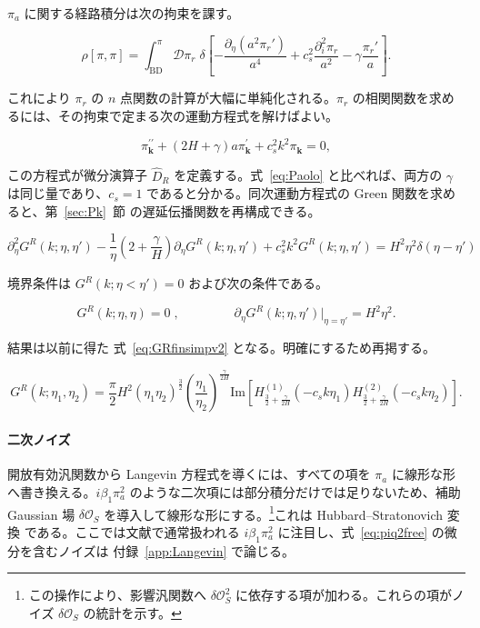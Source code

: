 \documentclass[a4paper,11pt]{ltjsarticle}
\numberwithin{equation}{section}
\def\pia{\pi_{a}}
\def\pir{\pi_{r}}
\def\bfk{\textbf{k}}
\newcommand{\Os}{\delta \mathcal{O}_{S}}
\newcommand{\Eq}[1]{Eq.~(\ref{#1})}
\newcommand{\Sec}[1]{Sec.~\ref{#1}}
\newcommand{\App}[1]{Appendix~\ref{#1}}
\renewcommand{\Eq}[1]{式~\eqref{#1}}
\renewcommand{\Sec}[1]{第~\ref{#1}~節}
\renewcommand{\App}[1]{付録~\ref{#1}}
\begin{document}
$\pia$ に関する経路積分は次の拘束を課す。

\begin{equation}
    \rho[\pi,\pi]=\int_{\text{BD}}^{\pi}\mathcal{D}\pir\;\delta\left[ - \frac{\partial_{\eta}\left(a^{2}\pir'\right)}{a^{4}} + c_{s}^{2}  \frac{\partial_i^{2} \pir}{a^{2}} -   \gamma  \frac{\pir'}{a}\right].
\end{equation}

これにより $\pir$ の $n$ 点関数の計算が大幅に単純化される。$\pir$ の相関関数を求めるには、その拘束で定まる次の運動方程式を解けばよい。

\begin{equation}
    \pi_{\bfk}^{\prime \prime} + \left( 2H + \gamma\right)a \pi_{\bfk}^{\prime}+c_{s}^{2}k^{2}\pi_{\bfk}=0,
\end{equation}

この方程式が微分演算子 $\widehat D_R$ を定義する。\Eq{eq:Paolo} と比べれば、両方の $\gamma$ は同じ量であり、$c_s=1$ であると分かる。同次運動方程式の Green 関数を求めると、\Sec{sec:Pk} の遅延伝播関数を再構成できる。

\begin{equation}
    \partial_{\eta}^{2}G^R(k;\eta,\eta')-\frac{1}{\eta}\left(2+\frac{\gamma}{H}\right)\partial_{\eta}G^R(k;\eta,\eta')+c_{s}^{2}k^{2}G^R(k;\eta,\eta')=H^{2}\eta^{2}\delta(\eta-\eta')
\end{equation}

境界条件は $G^R(k;\eta<\eta')=0$ および次の条件である。

\begin{equation}
    G^R(k;\eta,\eta)=0\;, \qquad \;\qquad \partial_{\eta}G^R(k;\eta,\eta')\bigg|_{\eta=\eta'}=H^{2}\eta^{2}.
\end{equation}

結果は以前に得た \Eq{eq:GRfinsimpv2} となる。明確にするため再掲する。

\begin{equation}
    G^R(k;\eta_{1},\eta_{2})=\frac{\pi}{2} H^{2} \left(\eta_{1}\eta_{2}\right)^{\frac{3}{2}}\left(\frac{\eta_{1}}{\eta_{2}}\right)^{\frac{\gamma}{2H}}\text{Im}\left[H_{\frac{3}{2}+\frac{\gamma}{2H}}^{(1)}(-c_{s}k\eta_{1})H_{\frac{3}{2}+\frac{\gamma}{2H}}^{(2)}(-c_{s}k\eta_{2})\right].
\end{equation}

\paragraph{二次ノイズ} 開放有効汎関数から Langevin 方程式を導くには、すべての項を $\pia$ に線形な形へ書き換える。$i\beta_1\pia^2$ のような二次項には部分積分だけでは足りないため、補助 Gaussian 場 $\Os$ を導入して線形な形にする。\footnote{この操作により、影響汎関数へ $\Os^2$ に依存する項が加わる。これらの項がノイズ $\Os$ の統計を示す。}これは Hubbard--Stratonovich 変換 \cite{Stratonovich1957,Hubbard1959} である。ここでは文献で通常扱われる $i\beta_1\pia^2$ に注目し、\Eq{eq:piq2free} の微分を含むノイズは \App{app:Langevin} で論じる。
\end{document}
